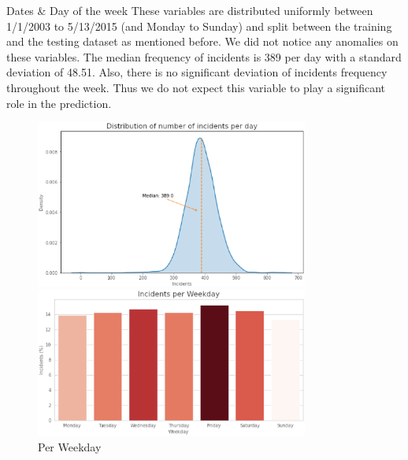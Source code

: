 \documentclass[
 size=14pt,
 paper=smartboard,  %
 mode=present, 		%
 display=slides, 	%
 style=tuliplab,  	%
 pauseslide,
 fleqn,leqno]{powerdot}
\begin{document}
\begin{slide}{Dates \& Day of the week}
  These variables are distributed uniformly between 1/1/2003 to 5/13/2015 (and Monday to Sunday) and split between the training and the testing dataset as mentioned before. We did not notice any anomalies on these variables.
  The median frequency of incidents is 389 per day with a standard deviation of 48.51.
  Also, there is no significant deviation of incidents frequency 
  throughout the week. Thus we do not expect this variable to play a 
  significant role in the prediction.


  \begin{figure}[htbp]
    \centering
    \begin{minipage}[t]{0.48\textwidth}
      \centering
      \includegraphics[width=0.8\textwidth]{kaggle/7.1.eps}
      \vspace{0.4em}
      \caption{Dates and Day of the Week}
    \end{minipage}
    \begin{minipage}[t]{0.48\textwidth}
      \centering
      \includegraphics[width=0.8\textwidth]{kaggle/8.1.eps}
      \vspace{0.4em}
      \caption{Per Weekday}
    \end{minipage}
  \end{figure}
\end{slide}
\end{document}
